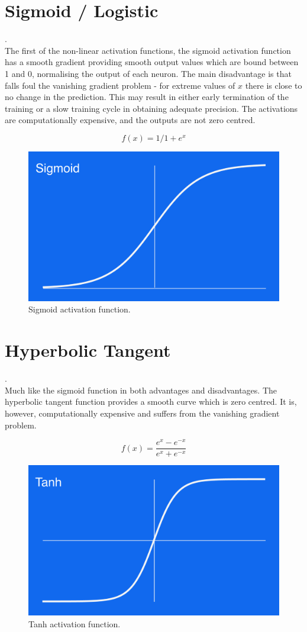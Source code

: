 \section{Sigmoid / Logistic}.\\

The first of the non-linear activation functions, the sigmoid activation function has a smooth gradient providing smooth output values which are bound between 1 and 0, normalising the output of each neuron. The main disadvantage is that falls foul the vanishing gradient problem - for extreme values of $x$ there is close to no change in the prediction. This may result in either early termination of the training or a slow training cycle in obtaining adequate precision. The activations are computationally expensive, and the outputs are not zero centred.

\begin{equation}
    f(x) = 1/1+e^x
\end{equation}
\begin{figure}[H]
\centering
\includegraphics[width=.265\textwidth]{sigmoid.png}
\caption{Sigmoid activation function.}
\end{figure}


\section{Hyperbolic Tangent}.\\
Much like the sigmoid function in both advantages and disadvantages. The hyperbolic tangent function provides a smooth curve which is zero centred. It is, however, computationally expensive and suffers from the vanishing gradient problem.

\begin{equation}
    f(x) = \frac {e^x - e^{-x}} {e^x + e^{-x}}
\end{equation}
\begin{figure}[H]
\centering
\includegraphics[width=.265\textwidth]{tanh.png}
\caption{Tanh activation function.}
\end{figure}



